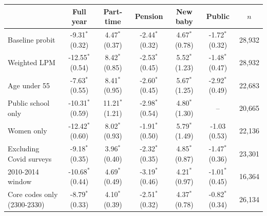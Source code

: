\begin{tabular}{lcccccc}
\toprule
 & Full year & Part-time & Pension & New baby & Public & $n$ \\
\midrule
Baseline probit & -9.31$^{*}$ (0.32) & 4.47$^{*}$ (0.37) & -2.44$^{*}$ (0.32) & 4.67$^{*}$ (0.78) & -1.72$^{*}$ (0.32) & 28,932 \\
Weighted LPM & -12.55$^{*}$ (0.54) & 8.42$^{*}$ (0.85) & -2.53$^{*}$ (0.45) & 5.52$^{*}$ (1.23) & -1.48$^{*}$ (0.47) & 28,932 \\
Age under 55 & -7.63$^{*}$ (0.55) & 8.41$^{*}$ (0.95) & -2.60$^{*}$ (0.45) & 5.67$^{*}$ (1.25) & -2.92$^{*}$ (0.49) & 22,683 \\
Public school only & -10.31$^{*}$ (0.59) & 11.21$^{*}$ (1.21) & -2.98$^{*}$ (0.54) & 4.80$^{*}$ (1.30) & -- & 20,665 \\
Women only & -12.42$^{*}$ (0.60) & 8.02$^{*}$ (0.93) & -1.91$^{*}$ (0.50) & 5.79$^{*}$ (1.49) & -1.03 (0.53) & 22,136 \\
Excluding Covid surveys & -9.18$^{*}$ (0.35) & 3.96$^{*}$ (0.40) & -2.32$^{*}$ (0.35) & 4.85$^{*}$ (0.87) & -1.47$^{*}$ (0.36) & 23,301 \\
2010-2014 window & -10.68$^{*}$ (0.44) & 4.69$^{*}$ (0.49) & -3.19$^{*}$ (0.46) & 4.21$^{*}$ (0.97) & -1.01$^{*}$ (0.45) & 16,364 \\
Core codes only (2300-2330) & -8.79$^{*}$ (0.33) & 4.10$^{*}$ (0.39) & -2.51$^{*}$ (0.32) & 4.37$^{*}$ (0.78) & -0.82$^{*}$ (0.34) & 26,134 \\
\bottomrule
\end{tabular}
